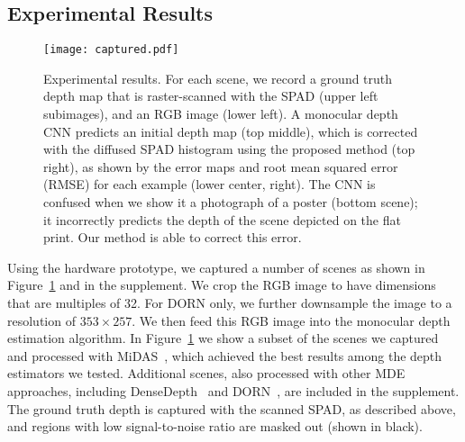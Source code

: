 %

\subsection{Experimental Results}
\begin{figure}[t]
	\centering
	\texttt{[image: captured.pdf]}
	\caption{Experimental results. For each scene, we record a ground truth depth
    map that is raster-scanned with the SPAD (upper left subimages), and an RGB
    image (lower left). A monocular depth CNN predicts an initial depth map (top
    middle), which is corrected with the diffused SPAD histogram using the
    proposed method (top right), as shown by the error maps and root mean
    squared error (RMSE) for each example (lower center, right). The CNN is
    confused when we show it a photograph of a poster (bottom scene); it
    incorrectly predicts the depth of the scene depicted on the flat print. Our
    method is able to correct this error.}
	\label{fig:results_captured}
\end{figure}

Using the hardware prototype, we captured a number of scenes as shown in
Figure~\ref{fig:results_captured} and in the supplement. We crop the RGB image
to have dimensions that are multiples of 32. For DORN only, we further
downsample the image to a resolution of $353 \times 257$. We then feed this RGB
image into the monocular depth estimation algorithm. In
Figure~\ref{fig:results_captured} we show a subset of the scenes we captured and
processed with MiDAS~\cite{Lasinger:2019}, which achieved the best results among
the depth estimators we tested. Additional scenes, also processed with other MDE
approaches, including DenseDepth~\cite{Alhashim2018} and DORN~\cite{Fu2018}, are
included in the supplement. The ground truth depth is captured with the scanned
SPAD, as described above, and regions with low signal-to-noise ratio are masked
out (shown in black).

